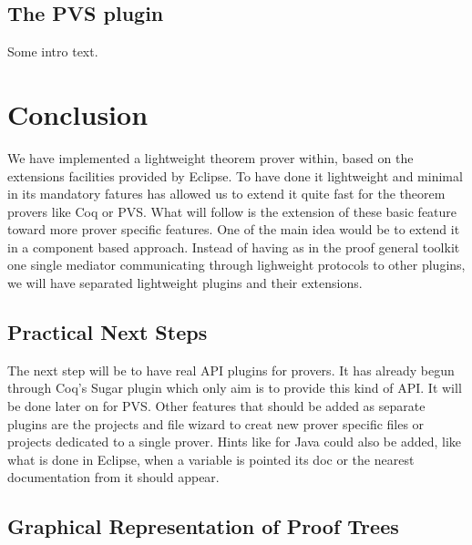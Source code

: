 \documentclass{entcs}
\begin{document}
\subsection{The PVS plugin}
\label{subsec:pvs-plugin}

Some intro text. %

\section{Conclusion}
\label{sec:conclusion}

We have implemented a lightweight theorem prover within, based on the extensions
facilities provided by Eclipse. To have done it lightweight and minimal in its mandatory
fatures has allowed us to extend it quite fast for the theorem provers like Coq or PVS.
What will follow is the extension of these basic feature toward more prover specific features.
One of the main idea would be to extend it in a component based approach.
Instead of having as in the proof general toolkit one single mediator communicating
through lighweight protocols to other plugins, we will have separated lightweight
plugins and their extensions.

\subsection{Practical Next Steps}
\label{subsec:practical-next-steps}

The next step will be to have real API plugins for provers. It has already begun
through Coq's Sugar plugin which only aim is to provide this kind of API.
It will be done later on for PVS. Other features that should be added
as separate plugins are the projects and file wizard to creat new prover specific
files or projects dedicated to a single prover.
Hints like for Java could also be added, like what is done in Eclipse, when a variable
is pointed its doc or the nearest documentation from it should appear. 


\subsection{Graphical Representation of Proof Trees}
\label{subsec:graph-repr-proof}
\end{document}
